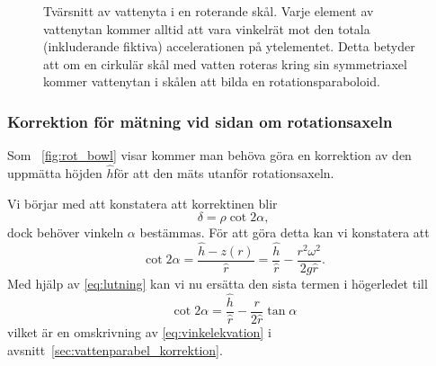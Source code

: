 \documentclass[11pt,a4paper]{article}
\newcommand{\figref}{\figurename~\ref}
\begin{document}
\begin{figure}\centering

\caption{\label{fig:vatten} Tvärsnitt av vattenyta i en roterande skål. Varje element av vattenytan kommer alltid att vara vinkelrät mot den totala (inkluderande fiktiva) accelerationen på ytelementet. Detta betyder att om en cirkulär skål med vatten roteras kring sin symmetriaxel kommer vattenytan i skålen att bilda en rotationsparaboloid.}
\end{figure}

\subsubsection{Korrektion för mätning vid sidan om rotationsaxeln}
Som \figref{fig:rot_bowl} visar kommer man behöva göra en korrektion av den uppmätta höjden $\hat{h}$för att den mäts utanför rotationsaxeln. 

Vi börjar med att konstatera att korrektinen blir
\[ \delta = \rho \cot{2\alpha}, \]
dock behöver vinkeln $\alpha$ bestämmas. För att göra detta kan vi konstatera att 
\[ \cot{2\alpha} = \frac{\hat{h}-z(r)}{\hat{r}} = \frac{\hat{h}}{\hat{r}} - \frac{r^2\omega^2}{2g\hat{r}}. \]
Med hjälp av \eqref{eq:lutning} kan vi nu ersätta den sista termen i högerledet till
\[ \cot{2\alpha} =  \frac{\hat{h}}{\hat{r}} - \frac{r}{2\hat{r}}\tan{\alpha} \]
vilket är en omskrivning av \eqref{eq:vinkelekvation} i avsnitt~\ref{sec:vattenparabel_korrektion}.
\end{document}
